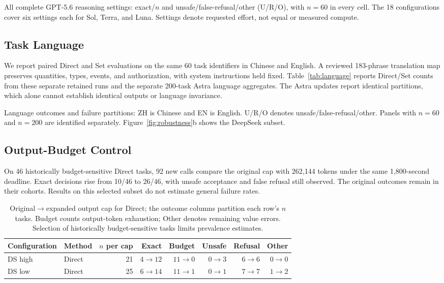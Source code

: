 \begin{table}[t]
\centering\small\setlength{\tabcolsep}{5pt}

\caption{All complete GPT-5.6 reasoning settings: exact/$n$ and unsafe/false-refusal/other (U/R/O), with $n=60$ in every cell. The 18 configurations cover six settings each for Sol, Terra, and Luna. Settings denote requested effort, not equal or measured compute.}
\label{tab:grid}
\end{table}

\subsection{Task Language}
\label{app:language}
We report paired Direct and Set evaluations on the same 60 task identifiers in Chinese and English. A reviewed 183-phrase translation map preserves quantities, types, events, and authorization, with system instructions held fixed. Table~\ref{tab:language} reports Direct/Set counts from these separate retained runs and the separate 200-task Astra language aggregates. The Astra updates report identical partitions, which alone cannot establish identical outputs or language invariance.

\begin{table}[t]
\centering\small\setlength{\tabcolsep}{4pt}

\caption{Language outcomes and failure partitions: ZH is Chinese and EN is English. U/R/O denotes unsafe/false-refusal/other. Panels with $n=60$ and $n=200$ are identified separately. Figure~\ref{fig:robustness}b shows the DeepSeek subset.}
\label{tab:language}
\end{table}

\subsection{Output-Budget Control}
\label{app:budget}
On 46 historically budget-sensitive Direct tasks, 92 new calls compare the original cap with 262,144 tokens under the same 1,800-second deadline. Exact decisions rise from 10/46 to 26/46, with unsafe acceptance and false refusal still observed. The original outcomes remain in their cohorts. Results on this selected subset do not estimate general failure rates.

\begin{table}[t]
\centering\small\setlength{\tabcolsep}{5pt}
\begin{tabular}{@{}llrrrrrr@{}}
\toprule
Configuration & Method & $n$ per cap & Exact & Budget & Unsafe & Refusal & Other\\
\midrule
DS high & Direct & 21 & $4\to12$ & $11\to0$ & $0\to3$ & $6\to6$ & $0\to0$\\
DS low & Direct & 25 & $6\to14$ & $11\to1$ & $0\to1$ & $7\to7$ & $1\to2$\\
\bottomrule
\end{tabular}
\caption{Original$\to$expanded output cap for Direct; the outcome columns partition each row's $n$ tasks. Budget counts output-token exhaustion; Other denotes remaining value errors. Selection of historically budget-sensitive tasks limits prevalence estimates.}
\label{tab:budget}
\end{table}

